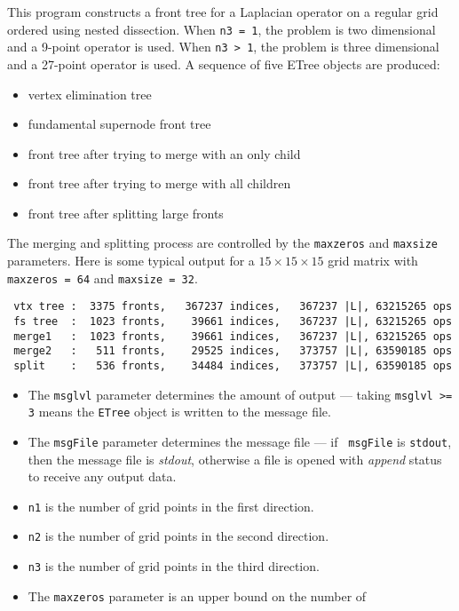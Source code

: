 \begin{enumerate}
\begin{verbatim}
\end{verbatim}
\par
This program constructs a front tree for a Laplacian operator on a
regular grid ordered using nested dissection.
When {\tt n3 = 1}, the problem is two dimensional and a 9-point
operator is used.
When {\tt n3 > 1}, the problem is three dimensional and a 27-point
operator is used.
A sequence of five ETree objects are produced:
\begin{itemize}
\item vertex elimination tree
\item fundamental supernode front tree
\item front tree after trying to merge with an only child
\item front tree after trying to merge with all children
\item front tree after splitting large fronts
\end{itemize}
The merging and splitting process are controlled by the 
{\tt maxzeros} and {\tt maxsize} parameters.
Here is some typical output for a $15 \times 15 \times 15$ grid
matrix with {\tt maxzeros = 64} and {\tt maxsize = 32}.
\begin{verbatim}
 vtx tree :  3375 fronts,   367237 indices,   367237 |L|, 63215265 ops
 fs tree  :  1023 fronts,    39661 indices,   367237 |L|, 63215265 ops
 merge1   :  1023 fronts,    39661 indices,   367237 |L|, 63215265 ops
 merge2   :   511 fronts,    29525 indices,   373757 |L|, 63590185 ops
 split    :   536 fronts,    34484 indices,   373757 |L|, 63590185 ops
\end{verbatim}
\begin{itemize}
\item
The {\tt msglvl} parameter determines the amount of output ---
taking {\tt msglvl >= 3} means the {\tt ETree} object is written
to the message file.
\item
The {\tt msgFile} parameter determines the message file --- if {\tt
msgFile} is {\tt stdout}, then the message file is {\it stdout},
otherwise a file is opened with {\it append} status to receive any
output data.
\item
{\tt n1} is the number of grid points in the first direction.
\item
{\tt n2} is the number of grid points in the second direction.
\item
{\tt n3} is the number of grid points in the third direction.
\item
The {\tt maxzeros} parameter is an upper bound on the number of

\end{itemize}
\end{enumerate}
